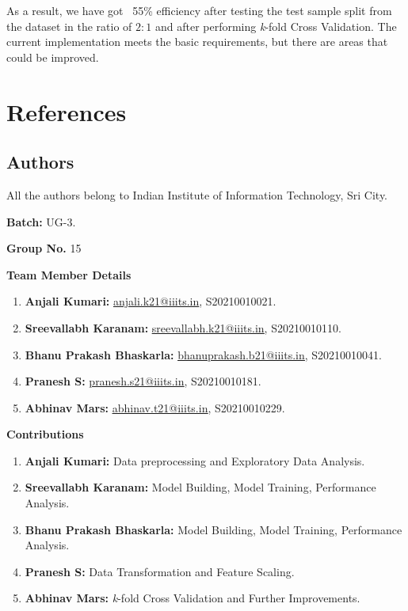 \documentclass{article}
\begin{document}
\begin{justify}
As a result, we have got ~55\% efficiency after testing the test sample split from the dataset in the ratio of $2:1$ and after performing \textit{k}-fold Cross Validation. The current implementation meets the basic requirements, but there are areas that could be improved. 

\section{References}\label{sec:references}

\subsection{Authors}\label{authors}
\setlength{\leftskip}{.2cm}
All the authors belong to Indian Institute of Information Technology, Sri City. 

\setlength{\leftskip}{-.3cm}
\textbf{Batch:} UG-3.

\setlength{\leftskip}{-.3cm}
\textbf{Group No.} 15

\vspace{.5cm}
\setlength{\leftskip}{-.5cm}
\textbf{Team Member Details}

\begin{enumerate}
    \item \label{author:anjali} \textbf{Anjali Kumari:} \href{mailto:anjali.k21@iiits.in}{\underline{anjali.k21@iiits.in}}, S20210010021.
    \item \label{author:sreevallabh} \textbf{Sreevallabh Karanam:} \href{mailto:sreevallabh.k21@iiits.in}{\underline{sreevallabh.k21@iiits.in}}, S20210010110.
    \item \label{author:bhanu} \textbf{Bhanu Prakash Bhaskarla:} \href{mailto:bhanuprakash.b21@iiits.in}{\underline{bhanuprakash.b21@iiits.in}}, S20210010041.
    \item \label{author:pranesh} \textbf{Pranesh S:} \href{mailto:pranesh.s21@iiits.in}{\underline{pranesh.s21@iiits.in}}, S20210010181.
    \item \label{author:abhinav} \textbf{Abhinav Mars:} \href{mailto:abhinav.t21@iiits.in}{\underline{abhinav.t21@iiits.in}}, S20210010229.
\end{enumerate}

\setlength{\leftskip}{-.5cm}
\textbf{Contributions}

\begin{enumerate}
    \item \label{author:anjali} \textbf{Anjali Kumari:} Data preprocessing and Exploratory Data Analysis.
    \item \label{author:sreevallabh} \textbf{Sreevallabh Karanam:} Model Building, Model Training, Performance Analysis.
    \item \label{author:bhanu} \textbf{Bhanu Prakash Bhaskarla:} Model Building, Model Training, Performance Analysis.
    \item \label{author:pranesh} \textbf{Pranesh S:} Data Transformation and Feature Scaling.
    \item \label{author:abhinav} \textbf{Abhinav Mars:} \textit{k}-fold Cross Validation and Further Improvements.
\end{enumerate}


\end{justify}
\end{document}

